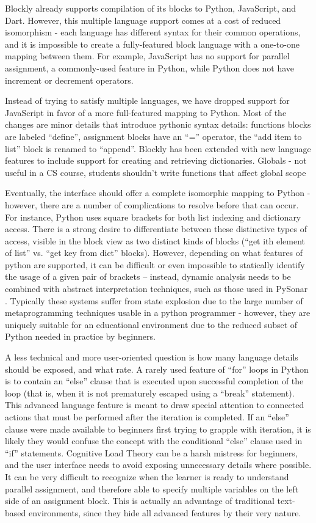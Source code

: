 \documentclass{sig-alternate}
\begin{document}
Blockly already supports compilation of its blocks to Python, JavaScript, and Dart.
However, this multiple language support comes at a cost of reduced isomorphism - each language has different syntax for their common operations, and it is impossible to create a fully-featured block language with a one-to-one mapping between them.
For example, JavaScript has no support for parallel assignment, a commonly-used feature in Python, while Python does not have increment or decrement operators.

Instead of trying to satisfy multiple languages, we have dropped support for JavaScript in favor of a more full-featured mapping to Python.
Most of the changes are minor details that introduce pythonic syntax details: functions blocks are labeled ``define'', assignment blocks have an ``='' operator, the ``add item to list'' block is renamed to ``append''.
Blockly has been extended with new language features to include support for creating and retrieving dictionaries.
Globals - not useful in a CS course, students shouldn't write functions that affect global scope

Eventually, the interface should offer a complete isomorphic mapping to Python - however, there are a number of complications to resolve before that can occur.
For instance, Python uses square brackets for both list indexing and dictionary access.
There is a strong desire to differentiate between these distinctive types of access, visible in the block view as two distinct kinds of blocks (``get ith element of list'' vs. ``get key from dict'' blocks).
However, depending on what features of python are supported, it can be difficult or even impossible to statically identify the usage of a given pair of brackets -- instead, dynamic analysis needs to be combined with abstract interpretation techniques, such as those used in PySonar .  %
Typically these systems suffer from state explosion due to the large number of metaprogramming techniques usable in a python programmer - however, they are uniquely suitable for an educational environment due to the reduced subset of Python needed in practice by beginners.

A less technical and more user-oriented question is how many language details should be exposed, and what rate.
A rarely used feature of ``for'' loops in Python is to contain an ``else'' clause that is executed upon successful completion of the loop (that is, when it is not prematurely escaped using a ``break'' statement).
This advanced language feature is meant to draw special attention to connected actions that must be performed after the iteration is completed.
If an ``else'' clause were made available to beginners first trying to grapple with iteration, it is likely they would confuse the concept with the conditional ``else'' clause used in ``if'' statements.
Cognitive Load Theory can be a harsh mistress for beginners, and the user interface needs to avoid exposing unnecessary details where possible.
It can be very difficult to recognize when the learner is ready to understand parallel assignment, and therefore able to specify multiple variables on the left side of an assignment block.
This is actually an advantage of traditional text-based environments, since they hide all advanced features by their very nature.
	
\end{document}
